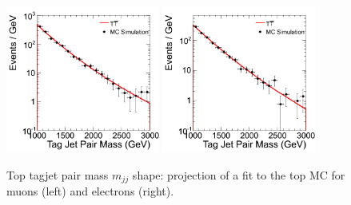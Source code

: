 \begin{figure}
\begin{center}
\includegraphics[width=0.45\textwidth]{figs/wpj/EWKW2jetstagjetmjj_top_muon_Model_12_Validate.png}
\includegraphics[width=0.45\textwidth]{figs/wpj/EWKW2jetstagjetmjj_top_electron_Model_12_Validate.png}
\end{center}
\caption{\label{fig:topFit} Top tagjet pair mass  $m_{jj}$ shape: projection of a fit to the top MC for muons (left) and electrons (right).}
\label{fig:topFit_Dijet}
\end{figure}

